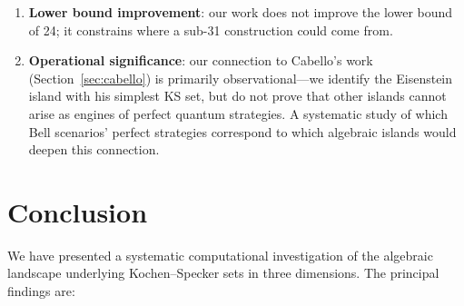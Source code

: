 \documentclass[12pt,a4paper]{article}
\begin{document}
\begin{enumerate}
    \item \textbf{Lower bound improvement}: our work does not improve the lower bound of 24; it constrains where a sub-31 construction could come from.
    \item \textbf{Operational significance}: our connection to Cabello's work (Section~\ref{sec:cabello}) is primarily observational---we identify the Eisenstein island with his simplest KS set, but do not prove that other islands cannot arise as engines of perfect quantum strategies. A systematic study of which Bell scenarios' perfect strategies correspond to which algebraic islands would deepen this connection.
\end{enumerate}

\section{Conclusion}\label{sec:conclusion}

We have presented a systematic computational investigation of the algebraic landscape underlying Kochen--Specker sets in three dimensions. The principal findings are:
\end{document}
